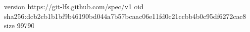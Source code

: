 version https://git-lfs.github.com/spec/v1
oid sha256:dcb2cb1b1bf9b46190bd044a7b57bcaac06e11fd0c21ccbb4b0c95df6272cac8
size 99790

